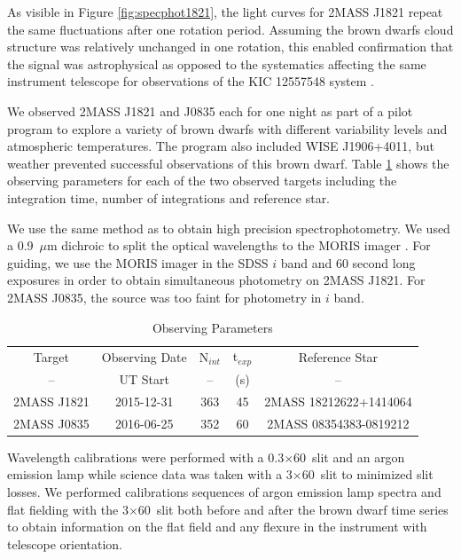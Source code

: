 \documentclass[twocolumn]{aastex6}
\begin{document}
As visible in Figure \ref{fig:specphot1821}, the light curves for 2MASS J1821 repeat the same fluctuations after one rotation period.
Assuming the brown dwarfs cloud structure was relatively unchanged in one rotation, this enabled confirmation that the signal was astrophysical as opposed to the systematics affecting the same instrument telescope for observations of the  KIC 12557548 system \citep{schlawin2016kic1255}.

We observed 2MASS J1821 and J0835 each for one night as part of a pilot program to explore a variety of brown dwarfs with different variability levels and atmospheric temperatures.
The program also included WISE J1906+4011, but weather prevented successful observations of this brown dwarf.
Table \ref{tab:obsParam} shows the observing parameters for each of the two observed targets including the integration time, number of integrations and reference star.

We use the same method as \citet{schlawin2014} to obtain high precision spectrophotometry.
We used a 0.9~$\mu$m dichroic to split the optical wavelengths to the MORIS imager \citep{Gulbis2011}.
For guiding, we use the MORIS imager in the SDSS $i$ band and 60 second long exposures in order to obtain simultaneous photometry on 2MASS J1821.
For 2MASS J0835, the source was too faint for photometry in $i$ band.

\begin{table}
\begin{center}
\caption{Observing Parameters}\label{tab:obsParam}
\begin{tabular}{ccccc}
Target & Observing Date & N$_{int}$ & t$_{exp}$ & Reference Star \\
-- & UT Start & -- & (s) & -- \\
\hline
2MASS J1821 & 2015-12-31 & 363 & 45 & 2MASS 18212622+1414064 \\
2MASS J0835 & 2016-06-25 & 352 & 60 & 2MASS 08354383-0819212 \\
\end{tabular}
\end{center}
\tablenotetext{}{}
\end{table}


Wavelength calibrations were performed with a 0.3$\times$60\arcsec\ slit and an argon emission lamp while science data was taken with a 3$\times$60\arcsec\ slit to minimized slit losses.
We performed calibrations sequences of argon emission lamp spectra and flat fielding with the 3$\times$60\arcsec\ slit both before and after the brown dwarf time series to obtain information on the flat field and any flexure in the instrument with telescope orientation.
\end{document}
